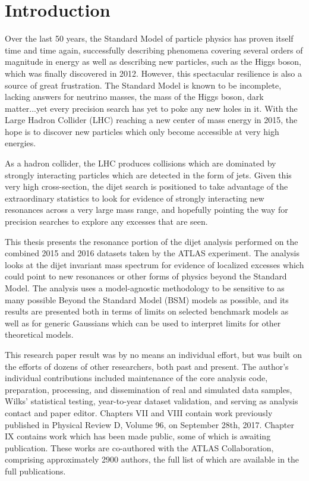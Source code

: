 
\chapter{Introduction}
\label{ch:Introduction}
Over the last 50 years, the Standard Model of particle physics has proven itself time and time again, successfully describing phenomena covering several orders of magnitude in energy as well as describing new particles, such as the Higgs boson, which was finally discovered in 2012.  However, this spectacular resilience is also a source of great frustration.  The Standard Model is known to be incomplete, lacking answers for neutrino masses, the mass of the Higgs boson, dark matter...yet every precision search has yet to poke any new holes in it.  With the Large Hadron Collider (LHC) reaching a new center of mass energy in 2015, the hope is to discover new particles which only become accessible at very high energies.

As a hadron collider, the LHC produces collisions which are dominated by strongly interacting particles which are detected in the form of jets.  Given this very high cross-section, the dijet search is positioned to take advantage of the extraordinary statistics to look for evidence of strongly interacting new resonances across a very large mass range, and hopefully pointing the way for precision searches to explore any excesses that are seen.

This thesis presents the resonance portion of the dijet analysis performed on the combined 2015 and 2016 datasets taken by the ATLAS experiment.\cite{Dijet2017}  The analysis looks at the dijet invariant mass spectrum for evidence of localized excesses which could point to new resonances or other forms of physics beyond the Standard Model.  The analysis uses a model-agnostic methodology to be sensitive to as many possible Beyond the Standard Model (BSM) models as possible, and its results are presented both in terms of limits on selected benchmark models as well as for generic Gaussians which can be used to interpret limits for other theoretical models.

This research paper result was by no means an individual effort, but was built on the efforts of dozens of other researchers, both past and present.  The author's individual contributions included maintenance of the core analysis code, preparation, processing, and dissemination of real and simulated data samples, Wilks' statistical testing, year-to-year dataset validation, and serving as analysis contact and paper editor.  Chapters VII and VIII contain work previously published in Physical Review D, Volume 96, on September 28th, 2017.\cite{Dijet2017}  Chapter IX contains work which has been made public, some of which is awaiting publication.\cite{DijetISR_Resolved}\cite{DijetTLA}\cite{DijetISR}  These works are co-authored with the ATLAS Collaboration, comprising approximately 2900 authors, the full list of which are available in the full publications.

